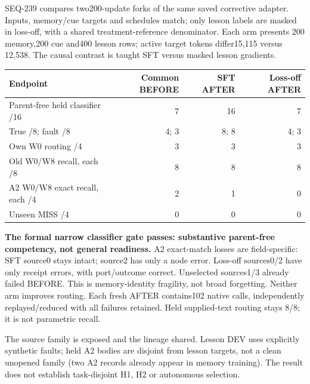 \documentclass{article}
\begin{document}
SEQ-239 compares two200-update forks of the same saved corrective adapter.
Inputs, memory/cue targets and schedules match; only lesson labels are masked
in loss-off, with a shared treatment-reference denominator. Each arm presents
200 memory,200 cue and400 lesson rows; active target tokens differ15,115 versus
12,538. The causal contrast is taught SFT versus masked lesson gradients.

\begin{center}
\small
\begin{tabular}{lrrr}
\toprule
Endpoint & Common BEFORE & SFT AFTER & Loss-off AFTER \\
\midrule
Parent-free held classifier /16 & 7 & 16 & 7 \\
True /8; fault /8 & 4; 3 & 8; 8 & 4; 3 \\
Own W0 routing /4 & 3 & 3 & 3 \\
Old W0/W8 recall, each /8 & 8 & 8 & 8 \\
A2 W0/W8 exact recall, each /4 & 2 & 1 & 0 \\
Unseen MISS /4 & 0 & 0 & 0 \\
\bottomrule
\end{tabular}
\end{center}

\textbf{The formal narrow classifier gate passes: substantive parent-free competency,
not general readiness.} A2 exact-match losses are field-specific: SFT source0
stays intact; source2 has only a node error. Loss-off sources0/2 have only
receipt errors, with port/outcome correct. Unselected sources1/3 already failed
BEFORE. This is memory-identity fragility, not broad forgetting. Neither arm
improves routing. Each fresh AFTER contains102 native calls, independently
replayed/reduced with all failures retained. Held supplied-text routing stays
8/8; it is not parametric recall.

The source family is exposed and the lineage shared. Lesson DEV uses explicitly
synthetic faults; held A2 bodies are disjoint from lesson targets, not a clean
unopened family (two A2 records already appear in memory training). The result
does not establish task-disjoint H1, H2 or autonomous selection.
\end{document}
